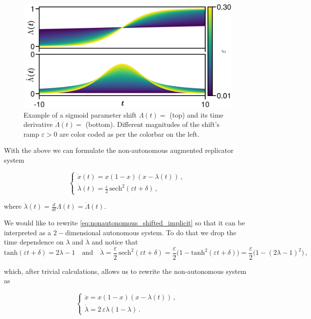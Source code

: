 \documentclass[../main.tex]{subfiles}
\begin{document}
\begin{figure}[H]
    \centering 
    \includegraphics[keepaspectratio, width=\textwidth]{../figures/fig:sigmoid_example.png}
    \caption{Example of a sigmoid parameter shift $\Lambda(t) = $ (top) and its time derivative $\dot{\Lambda}(t) = $ (bottom). Different magnitudes of the shift's ramp $\varepsilon>0$ are color coded as per the colorbar on the left.
    }
    \label{fig:sigmoid_example}
\end{figure}

With the above we can formulate the non-autonomous augmented replicator system 

\begin{equation}\label{eq:nonautonomous_shifted_implicit}
   \begin{cases}
           \dot{x}(t) = x(1-x)(x - \lambda(t))\,, \\
           \dot{\lambda}(t) =  \frac{\varepsilon}{2}\,\text{sech}^{2}(\varepsilon t + \delta)\,,
   \end{cases}
\end{equation}

where $\dot{\lambda}(t) = \frac{d}{dt}\Lambda(t) = \dot{\Lambda}(t)$.

We would like to rewrite \eqref{eq:nonautonomous_shifted_implicit} so that it can be interpreted as a $2-$dimensional autonomous system.
To do that we drop the time dependence on $\lambda$ and $\dot{\lambda}$ and notice that
\begin{equation*}
        \text{tanh}(\varepsilon t + \delta) = 2\lambda - 1\quad \text{and}\quad \dot{\lambda} = \frac{\varepsilon}{2}\,\text{sech}^{2}(\varepsilon t + \delta) = \frac{\varepsilon}{2}\Big(1 - \text{tanh}^{2}(\varepsilon t + \delta)\Big) = \frac{\varepsilon}{2}\big(1 - (2\lambda - 1)^{2}\big)\,,
\end{equation*}

which, after trivial calculations, allows us to rewrite the non-autonomous system as

\begin{equation}\label{eq:nonautonomous_shifted}
   \begin{cases}
           \dot{x} = x(1-x)(x - \lambda(t))\,, \\
           \dot{\lambda} =  2\,\varepsilon\lambda(1-\lambda)\,.
   \end{cases}
\end{equation}
\end{document}
